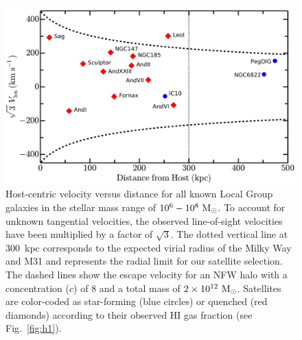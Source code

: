 \begin{figure}
  \centering
 \hspace*{-0.05in}
 \includegraphics[width=6.5in]{tcbflash/f1.pdf}
 \caption[Local Group dwarf galaxy phase space]{Host-centric velocity versus distance for all known Local
   Group galaxies in the stellar mass range of
   $10^{6}-10^{8}~{\rm M}_{\odot}$. To account for unknown tangential
   velocities, the observed line-of-sight velocities have been multiplied by a
   factor of $\sqrt{3}$. The dotted vertical line at $300$~kpc
   corresponds to the expected virial radius of the Milky Way and M31
   and represents the radial limit for our satellite selection. The
   dashed lines show the escape velocity for an NFW halo with a
   concentration ($c$) of $8$ and a total mass of $2\times 10^{12}\
   \rm {\rm M}_{\odot}$. Satellites are color-coded as star-forming (blue
   circles) or quenched (red diamonds) according to their observed
   H{\scriptsize I} gas fraction (see
   Fig.~\ref{fig:h1}). }
 \label{fig:vlos}
\end{figure}



